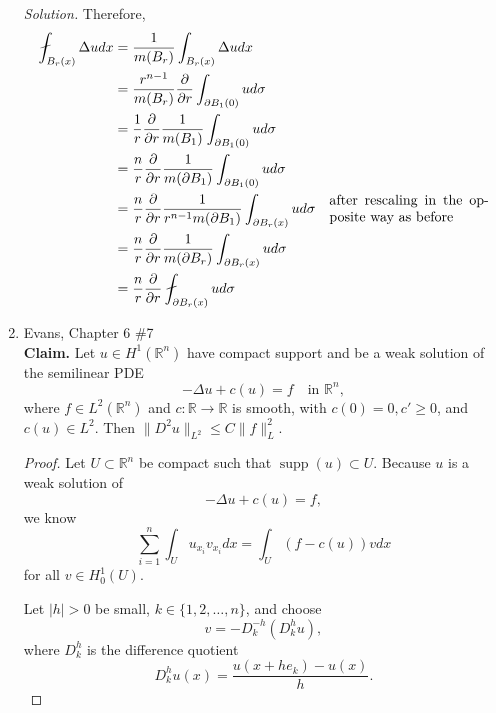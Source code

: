 \documentclass[a4paper]{article}
\newenvironment{solution}{\emph{Solution.}}{}
\newenvironment{claim}{\textbf{Claim.}}{}
\newcommand{\R}{\mathbb{R}}
\newcommand{\supp}[1]{\mathop{\mathrm{supp}}\left(#1\right)}
\begin{document}
\begin{enumerate}
\begin{solution}
      Therefore,
      \begin{align*}
        \fint_{B_r(x)}^{} \Delta u dx
        &=\frac{1}{m(B_r)} \int_{B_r(x)}^{} \Delta u dx \\
        &= \frac{r^{n-1}}{m(B_r)} \frac{\partial}{\partial r} \int_{\partial B_1(0)}^{} u d\sigma \\
        &= \frac{1}{r} \frac{\partial}{\partial r} \frac{1}{m(B_1)} \int_{\partial B_1(0)}^{} u d\sigma \\
        &= \frac{n}{r} \frac{\partial}{\partial r} \frac{1}{m(\partial B_1)} \int_{\partial B_1(0)}^{} u d\sigma \\
        &= \frac{n}{r} \frac{\partial}{\partial r} \frac{1}{r^{n-1} m(\partial B_1)} \int_{\partial B_r(x)}^{} u d\sigma \quad \parbox{4cm}{after
        rescaling in the opposite way as before} \\
        &= \frac{n}{r} \frac{\partial}{\partial r} \frac{1}{m(\partial B_r)} \int_{\partial B_r(x)}^{} u d\sigma \\
        &= \frac{n}{r} \frac{\partial}{\partial r} \fint_{\partial B_r(x)}^{} u d\sigma
      \end{align*}

    \end{solution}

  \item Evans, Chapter 6 \#7 \\
    \begin{claim}
      Let $u \in H^1(\R^n)$ have compact support and be a weak solution of the semilinear PDE
      \[ - \Delta u + c(u) = f \quad \text{in } \R^n ,\]
      where $f \in L^2(\R^n)$ and $c: \R \to \R$ is smooth, with $c(0) = 0, c' \geq 0$, and $c(u) \in L^2$. Then $\|D^2 u \|_{L^2} \leq C \|f\|_L^2$.
    \end{claim}

    \begin{proof}
      Let $U \subset \R^n$ be compact such that $\supp{u} \subset U$. Because $u$ is a weak solution of
      \[ -\Delta u + c(u) = f ,\]
      we know
      \[ \sum_{i = 1}^n \int_{U}^{} u_{x_i} v_{x_i} dx = \int_{U}^{} (f - c(u)) v dx \]
      for all $v \in H_0^1(U)$.

      Let $|h| > 0$ be small, $k \in \{1,2,\dots,n\}$, and choose
      \[ v = -D_k^{-h} (D_k^h u) ,\]
      where $D_k^h$ is the difference quotient
      \[ D_k^h u(x) = \frac{u(x + h e_k) - u(x)}{h} .\]


\end{proof}
\end{enumerate}
\end{document}
